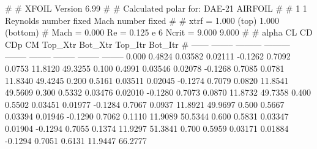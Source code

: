 #  
#       XFOIL         Version 6.99
#  
# Calculated polar for: DAE-21 AIRFOIL                                  
#  
# 1 1 Reynolds number fixed          Mach number fixed         
#  
# xtrf =   1.000 (top)        1.000 (bottom)  
# Mach =   0.000     Re =     0.125 e 6     Ncrit =   9.000  9.000
#  
#   alpha    CL        CD       CDp       CM     Top_Xtr  Bot_Xtr  Top_Itr  Bot_Itr
#  ------ -------- --------- --------- -------- -------- -------- -------- --------
   0.000   0.4824   0.03582   0.02111  -0.1262   0.7092   0.0753  11.8120  49.3255
   0.100   0.4991   0.03546   0.02078  -0.1268   0.7085   0.0781  11.8340  49.4245
   0.200   0.5161   0.03511   0.02045  -0.1274   0.7079   0.0820  11.8541  49.5609
   0.300   0.5332   0.03476   0.02010  -0.1280   0.7073   0.0870  11.8732  49.7358
   0.400   0.5502   0.03451   0.01977  -0.1284   0.7067   0.0937  11.8921  49.9697
   0.500   0.5667   0.03394   0.01946  -0.1290   0.7062   0.1110  11.9089  50.5344
   0.600   0.5831   0.03347   0.01904  -0.1294   0.7055   0.1374  11.9297  51.3841
   0.700   0.5959   0.03171   0.01884  -0.1294   0.7051   0.6131  11.9447  66.2777
